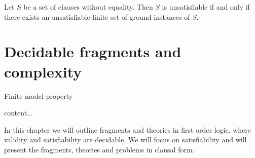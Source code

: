 \begin{corollary}
	Let $S$ be a set of clauses without equality. 
	Then $S$ is unsatisfiable if and only if there exists 
	an unsatisfiable finite set of ground instances of $S$.
\end{corollary}

\begin{lemma}
	
\end{lemma}



\section{Decidable fragments and complexity}

\begin{definition}Finite model property
\end{definition}


\begin{theorem}
	content...
\end{theorem}



In this chapter we will outline fragments and theories in first order logic, 
where validity and satisfiability are decidable. 
We will focus on satisfiability and will present the fragments, theories and problems in clausal form.






